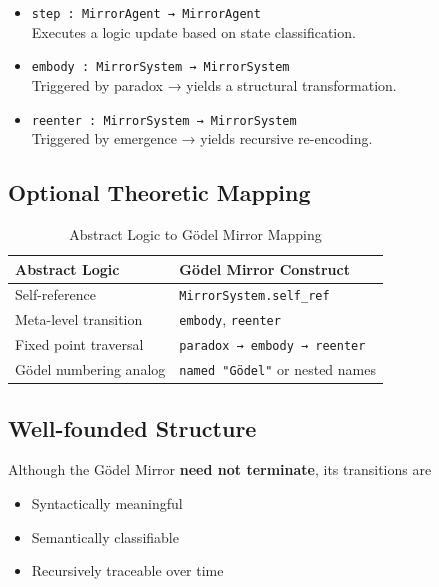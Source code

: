 \documentclass[manuscript,nonacm]{acmart}
\begin{document}
\begin{itemize}
\item \texttt{step : MirrorAgent → MirrorAgent}\\
    Executes a logic update based on state classification.
    
\item \texttt{embody : MirrorSystem → MirrorSystem}\\
    Triggered by paradox → yields a structural transformation.
    
\item \texttt{reenter : MirrorSystem → MirrorSystem}\\
    Triggered by emergence → yields recursive re-encoding.
\end{itemize}

\subsection{Optional Theoretic Mapping}

\begin{table}[H]
  \caption{Abstract Logic to Gödel Mirror Mapping}
  \label{tab:logic-mapping}
  \begin{tabular}{@{}ll@{}}
    \toprule
    \textbf{Abstract Logic} & \textbf{Gödel Mirror Construct} \\
    \midrule
    Self-reference & \texttt{MirrorSystem.self\_ref} \\
    Meta-level transition & \texttt{embody}, \texttt{reenter} \\
    Fixed point traversal & \texttt{paradox → embody → reenter} \\
    Gödel numbering analog & \texttt{named "Gödel"} or nested names \\
    \bottomrule
  \end{tabular}
\end{table}

\subsection{Well-founded Structure}

Although the Gödel Mirror \textbf{need not terminate}, its transitions are

\begin{itemize}
\item Syntactically meaningful
\item Semantically classifiable
\item Recursively traceable over time
\end{itemize}
\end{document}
